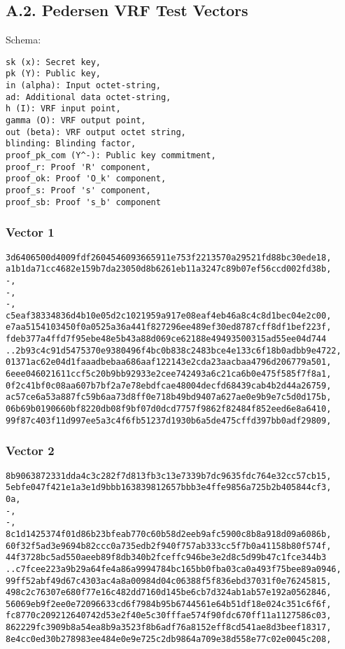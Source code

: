 \documentclass[
]{article}
\begin{document}
\hypertarget{a.2.-pedersen-vrf-test-vectors}{%
\subsection{A.2. Pedersen VRF Test
Vectors}\label{a.2.-pedersen-vrf-test-vectors}}

Schema:

\begin{verbatim}
sk (x): Secret key,
pk (Y): Public key,
in (alpha): Input octet-string,
ad: Additional data octet-string,
h (I): VRF input point,
gamma (O): VRF output point,
out (beta): VRF output octet string,
blinding: Blinding factor,
proof_pk_com (Y^-): Public key commitment,
proof_r: Proof 'R' component,
proof_ok: Proof 'O_k' component,
proof_s: Proof 's' component,
proof_sb: Proof 's_b' component
\end{verbatim}

\hypertarget{vector-1-1}{%
\subsubsection{Vector 1}\label{vector-1-1}}

\begin{verbatim}
3d6406500d4009fdf2604546093665911e753f2213570a29521fd88bc30ede18,
a1b1da71cc4682e159b7da23050d8b6261eb11a3247c89b07ef56ccd002fd38b,
-,
-,
-,
c5eaf38334836d4b10e05d2c1021959a917e08eaf4eb46a8c4c8d1bec04e2c00,
e7aa5154103450f0a0525a36a441f827296ee489ef30ed8787cff8df1bef223f,
fdeb377a4ffd7f95ebe48e5b43a88d069ce62188e49493500315ad55ee04d744
..2b93c4c91d5475370e9380496f4bc0b838c2483bce4e133c6f18b0adbb9e4722,
01371ac62e04d1faaadbebaa686aaf122143e2cda23aacbaa4796d206779a501,
6eee046021611ccf5c20b9bb92933e2cee742493a6c21ca6b0e475f585f7f8a1,
0f2c41bf0c08aa607b7bf2a7e78ebdfcae48004decfd68439cab4b2d44a26759,
ac57ce6a53a887fc59b6aa73d8ff0e718b49bd9407a627ae0e9b9e7c5d0d175b,
06b69b0190660bf8220db08f9bf07d0dcd7757f9862f82484f852eed6e8a6410,
99f87c403f11d997ee5a3c4f6fb51237d1930b6a5de475cffd397bb0adf29809,
\end{verbatim}

\hypertarget{vector-2-1}{%
\subsubsection{Vector 2}\label{vector-2-1}}

\begin{verbatim}
8b9063872331dda4c3c282f7d813fb3c13e7339b7dc9635fdc764e32cc57cb15,
5ebfe047f421e1a3e1d9bbb163839812657bbb3e4ffe9856a725b2b405844cf3,
0a,
-,
-,
8c1d1425374f01d86b23bfeab770c60b58d2eeb9afc5900c8b8a918d09a6086b,
60f32f5ad3e9694b82ccc0a735edb2f940f757ab333cc5f7b0a41158b80f574f,
44f3728bc5ad550aeeb89f8db340b2fceffc946be3e2d8c5d99b47c1fce344b3
..c7fcee223a9b29a64fe4a86a9994784bc165bb0fba03ca0a493f75bee89a0946,
99ff52abf49d67c4303ac4a8a00984d04c06388f5f836ebd37031f0e76245815,
498c2c76307e680f77e16c482dd7160d145be6cb7d324ab1ab57e192a0562846,
56069eb9f2ee0e72096633cd6f7984b95b6744561e64b51df18e024c351c6f6f,
fc8770c209212640742d53e2f40e5c30fffae574f90fdc670ff11a1127586c03,
862229fc3909b8a54ea8b9a3523f8b6adf76a8152eff8cd541ae8d3beef18317,
8e4cc0ed30b278983ee484e0e9e725c2db9864a709e38d558e77c02e0045c208,
\end{verbatim}
\end{document}
